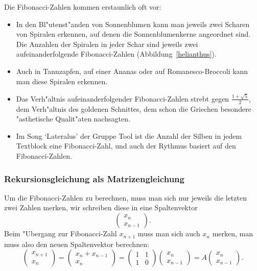 Die Fibonacci-Zahlen kommen erstaunlich oft vor:
\begin{itemize}
\item In den Bl"utenst"anden von Sonnenblumen kann man jeweils zwei
Scharen von Spiralen erkennen, auf denen die Sonnenblumenkerne angeordnet sind.
Die Anzahlen der Spiralen in jeder Schar sind jeweils zwei aufeinanderfolgende
Fibonacci-Zahlen (Abbildung~\ref{helianthus}).
\item Auch in Tannzapfen, auf einer Ananas oder auf Romanesco-Broccoli
kann man diese Spiralen erkennen.
\item Das Verh"altnis aufeinanderfolgender Fibonacci-Zahlen strebt gegen
$\frac{1+\sqrt{5}}2$, dem Verh"altnis des goldenen Schnittes, dem schon die
Griechen besondere "asthetische Qualit"aten nachsagten.
\item Im Song `Lateralus' der Gruppe Tool ist die Anzahl der Silben
in jedem Textblock eine Fibonacci-Zahl, und auch der Rythmus basiert
auf den Fibonacci-Zahlen.
\end{itemize}

\subsubsection{Rekursionsgleichung als Matrizengleichung}
Um die Fibonacci-Zahlen zu berechnen, muss man sich nur jeweils die letzten zwei
Zahlen merken, wir schreiben diese in eine Spaltenvektor
\[
\begin{pmatrix}x_n\\x_{n-1}\end{pmatrix}.
\]
Beim "Ubergang zur Fibonacci-Zahl $x_{n+1}$ muss man sich auch $x_n$ merken,
man muss also den neuen Spaltenvektor berechnen:
\begin{equation}
\begin{pmatrix}x_{n+1}\\x_n\end{pmatrix}
=
\begin{pmatrix}x_n+x_{n-1}\\x_n\end{pmatrix}
=
\begin{pmatrix}
1&1\\
1&0
\end{pmatrix}
\begin{pmatrix}x_n\\x_{n-1}\end{pmatrix}
=
A
\begin{pmatrix}x_n\\x_{n-1}\end{pmatrix}.
\label{fibonaccirekursion}
\end{equation}
